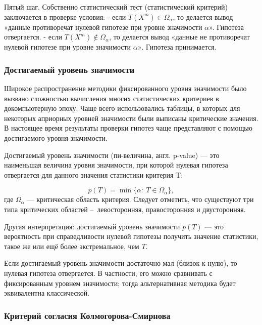 \documentclass[11pt]{article}
\begin{document}
Пятый шаг. Собственно статистический тест (статистический критерий)
заключается в проверке условия: - если \(T(X^m)\in\Omega_\alpha\), то
делается вывод «данные противоречат нулевой гипотезе при уровне
значимости \(\alpha\)». Гипотеза отвергается. - если
\(T(X^m)\notin\Omega_\alpha\), то делается вывод «данные не противоречат
нулевой гипотезе при уровне значимости \(\alpha»\). Гипотеза
принимается.

\subsubsection{Достигаемый уровень
значимости}\label{ux434ux43eux441ux442ux438ux433ux430ux435ux43cux44bux439-ux443ux440ux43eux432ux435ux43dux44c-ux437ux43dux430ux447ux438ux43cux43eux441ux442ux438}

Широкое распространение методики фиксированного уровня значимости было
вызвано сложностью вычисления многих статистических критериев в
докомпьютерную эпоху. Чаще всего использовались таблицы, в которых для
некоторых априорных уровней значимости были выписаны критические
значения. В настоящее время результаты проверки гипотез чаще
представляют с помощью достигаемого уровня значимости.

Достигаемый уровень значимости (пи-величина, англ. p-value) --- это
наименьшая величина уровня значимости, при которой нулевая гипотеза
отвергается для данного значения статистики критерия T:

\[p(T) = \min \{ \alpha:\: T\in\Omega_\alpha \},\] где \(\Omega_\alpha\)
--- критическая область критерия. Следует отметить, что существуют три
типа критических областей --~левосторонняя, правосторонняя и
двусторонняя.

Другая интерпретация: достигаемый уровень значимости \(p(T)\) --- это
вероятность при справедливости нулевой гипотезы получить значение
статистики, такое же или ещё более экстремальное, чем \(T\).

Если достигаемый уровень значимости достаточно мал (близок к нулю), то
нулевая гипотеза отвергается. В частности, его можно сравнивать с
фиксированным уровнем значимости; тогда альтернативная методика будет
эквивалентна классической.

\subsubsection{Критерий согласия
Колмогорова-Смирнова}\label{ux43aux440ux438ux442ux435ux440ux438ux439-ux441ux43eux433ux43bux430ux441ux438ux44f-ux43aux43eux43bux43cux43eux433ux43eux440ux43eux432ux430-ux441ux43cux438ux440ux43dux43eux432ux430}
\end{document}
